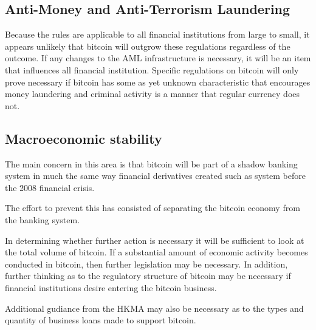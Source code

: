 \subsection{Anti-Money and Anti-Terrorism Laundering}

Because the rules are applicable to all financial institutions from
large to small, it appears unlikely that bitcoin will outgrow these
regulations regardless of the outcome.  If any changes to the AML
infrastructure is necessary, it will be an item that influences all
financial institution.  Specific regulations on bitcoin will only
prove necessary if bitcoin has some as yet unknown characteristic that
encourages money laundering and criminal activity is a manner that
regular currency does not.

\subsection{Macroeconomic stability}

The main concern in this area is that bitcoin will be part of a
shadow banking system in much the same way financial derivatives
created such as system before the 2008 financial crisis.

The effort to prevent this has consisted of separating the bitcoin
economy from the banking system.  

In determining whether further action is necessary it will be
sufficient to look at the total volume of bitcoin.  If a substantial
amount of economic activity becomes conducted in bitcoin, then further
legislation may be necessary.  In addition, further thinking as to the
regulatory structure of bitcoin may be necessary if financial
institutions desire entering the bitcoin business.

Additional gudiance from the HKMA may also be necessary as to the
types and quantity of business loans made to support bitcoin.



